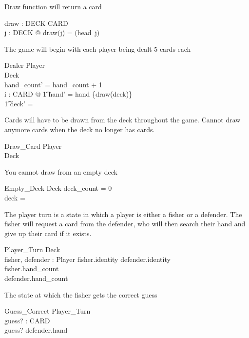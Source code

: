 \documentclass{article}
\begin{document}
Draw function will return a card
\begin{axdef}
    draw : DECK \fun CARD\\
    \where
    \forall j : DECK @ draw(j) = (head~j)\\
\end{axdef}

The game will begin with each player being dealt 5 cards each
\begin{schema}{Dealer}
    \Delta Player \\
    \Delta Deck \\
    \where
    hand\_count' = hand\_count + 1\\
    \forall i : CARD @
    \t1 hand' = hand \cup \{draw(deck)\} \\
    \t1 deck' =  
\end{schema}

Cards will have to be drawn from the deck throughout the game.
Cannot draw anymore cards when the deck no longer has cards.
\begin{schema}{Draw\_Card}
    \Delta Player\\
    \Delta Deck\\
\end{schema}

You cannot draw from an empty deck
\begin{schema}{Empty\_Deck}
    \Xi Deck
    \where
    deck\_count = 0 \\
    deck = \emptyset
\end{schema}

The player turn is a state in which a player is either a fisher
or a defender. The fisher will request a card from the defender,
who will then search their hand and give up their card if it exists.
\begin{schema}{Player\_Turn}
    \Xi Deck \\
    fisher, defender : Player
    \where
    fisher.identity \neq defender.identity\\
    fisher.hand\_count \\
    defender.hand\_count \\ 
\end{schema}

The state at which the fisher gets the correct guess
\begin{schema}{Guess\_Correct}
    \Delta Player\_Turn \\
    guess? : CARD \\
    \where
    guess? \in defender.hand \\
\end{schema}
\end{document}
